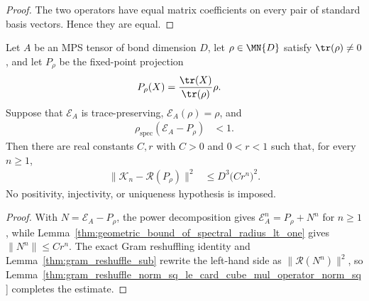 \begin{proof}
    \leanok
    The two operators have equal matrix coefficients on every pair of standard
    basis vectors.  Hence they are equal.
\end{proof}

\begin{lemma}
    \label{thm:ground_space_gram_geometric_fixed_point}
    \leanok
    Let $A$ be an MPS tensor of bond dimension $D$, let $\rho\in\MN{D}$ satisfy
    $\tr(\rho)\neq0$, and let $P_\rho$ be the fixed-point projection
    \begin{align}
        P_\rho(X) & =\frac{\tr(X)}{\tr(\rho)}\rho.
    \end{align}
    Suppose that $\mathcal E_A$ is trace-preserving,
    $\mathcal E_A(\rho)=\rho$, and
    \begin{align}
        \rho_{\mathrm{spec}}(\mathcal E_A-P_\rho) & <1.
    \end{align}
    Then there are real constants $C,r$ with $C>0$ and $0<r<1$ such that,
    for every $n\geq1$,
    \begin{align}
        \bigl\lVert\mathcal K_n-\mathscr R(P_\rho)\bigr\rVert^2
         & \leq D^3\bigl(Cr^n\bigr)^2.
        \label{eq:ground_space_gram_geometric_fixed_point}
    \end{align}
    No positivity, injectivity, or uniqueness hypothesis is imposed.
\end{lemma}

\begin{proof}
    \leanok
    With $N=\mathcal E_A-P_\rho$, the power decomposition gives
    $\mathcal E_A^n=P_\rho+N^n$ for $n\geq1$, while
    Lemma~\ref{thm:geometric_bound_of_spectral_radius_lt_one} gives
    $\lVert N^n\rVert\leq Cr^n$.  The exact Gram reshuffling identity and
    Lemma~\ref{thm:gram_reshuffle_sub} rewrite the left-hand side as
    $\lVert\mathscr R(N^n)\rVert^2$, so
    Lemma~\ref{thm:gram_reshuffle_norm_sq_le_card_cube_mul_operator_norm_sq}
    completes the estimate.
\end{proof}

